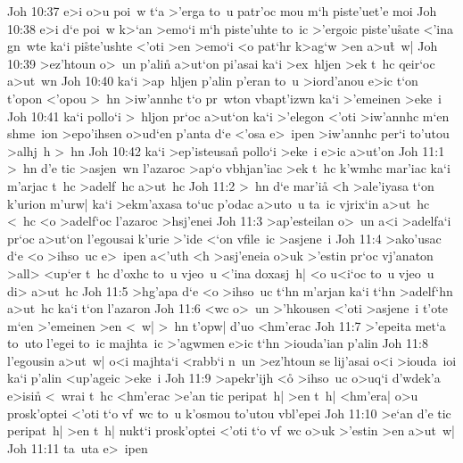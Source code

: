 \vs Joh 10:37
e>i
o>u
poi~w
t`a
>'erga
to~u
patr'oc
mou
m`h
piste'uet'e
moi\bibvsend
\vs Joh 10:38
e>i
d`e
poi~w
k>`an
>emo`i
m`h
piste'uhte
to~ic
>'ergoic
piste'u\r{s}ate
<'ina
gn~wte
ka`i
pi\r{s}te'ushte
<'oti
>en
>emo`i
<o
pat`hr
k>ag`w
>en
a>u\r{t}~w|\bibvsend
{}
\vs Joh 10:39
>ez'htoun
o>~un
p'alin\r{}
a>ut`on
pi'asai
ka`i
>ex~hljen
>ek
t~hc
qeir`oc
a>ut~wn\bibvsend
\vs Joh 10:40
ka`i
>ap~hljen
p'alin
p'eran
to~u
>iord'anou
e>ic
t`on
t'opon
<'opou
>~hn
>iw'annhc
t`o
pr~wton
vbapt'izwn
ka`i
>'emeinen
>eke~i\bibvsend
\vs Joh 10:41
ka`i
pollo`i
>~hljon
pr`oc
a>ut`on
ka`i
>'elegon
<'oti
>iw'annhc
m`en
shme~ion
>epo'ihsen
o>ud`en
p'anta
d`e
<'osa
e>~ipen
>iw'annhc
per`i
to'utou
>alhj~h
>~hn\bibvsend
\vs Joh 10:42
ka`i
>ep'isteusan\r{}
pollo`i
>eke~i
e>ic
a>ut'on\bibvsend
\vs Joh 11:1
>~hn
d'e
tic
>asjen~wn
l'azaroc
>ap`o
vbhjan'iac
>ek
t~hc
k'wmhc
mar'iac
ka`i
m'arjac
t~hc
>adelf~hc
a>ut~hc\bibvsend
\vs Joh 11:2
>~hn
d`e
mar'i\r{a}
<h
>ale'iyasa
t`on
k'urion
m'urw|
ka`i
>ekm'axasa
to`uc
p'odac
a>uto~u
ta~ic
vjrix`in
a>ut~hc
<~hc
<o
>adelf`oc
l'azaroc
>hsj'enei\bibvsend
\vs Joh 11:3
>ap'esteilan
o>~un
a<i
>adelfa`i
pr`oc
a>ut`on
l'egousai
k'urie
>'ide
<`on
vfile~ic
>asjene~i\bibvsend
\vs Joh 11:4
>ako'usac
d`e
<o
>ihso~uc
e>~ipen
a<'uth
<h
>asj'eneia
o>uk
>'estin
pr`oc
vj'anaton
>all>
<up`er
t~hc
d'oxhc
to~u
vjeo~u
<'ina
doxasj~h|
<o
u<i`oc
to~u
vjeo~u
di>
a>ut~hc\bibvsend
\vs Joh 11:5
>hg'apa
d`e
<o
>ihso~uc
t`hn
m'arjan
ka`i
t`hn
>adelf`hn
a>ut~hc
ka`i
t`on
l'azaron\bibvsend
\vs Joh 11:6
<wc
o>~un
>'hkousen
<'oti
>asjene~i
t'ote
m`en
>'emeinen
>en
<~w|
>~hn
t'opw|
d'uo
<hm'erac\bibvsend
\vs Joh 11:7
>'epeita
met`a
to~uto
l'egei
to~ic
majhta~ic
>'agwmen
e>ic
t`hn
>iouda'ian
p'alin\bibvsend
\vs Joh 11:8
l'egousin
a>ut~w|
o<i
majhta`i
<rabb`i
n~un
>ez'htoun
se
lij'asai
o<i
>iouda~ioi
ka`i
p'alin
<up'ageic
>eke~i\bibvsend
\vs Joh 11:9
>apekr'ijh
<o\r{}
>ihso~uc
o>uq`i
d'wdek'a
e>isin\r{}
<~wrai
t~hc
<hm'erac
>e'an
tic
peripat~h|
>en
t~h|
<hm'era|
o>u
prosk'optei
<'oti
t`o
vf~wc
to~u
k'osmou
to'utou
vbl'epei\bibvsend
\vs Joh 11:10
>e`an
d'e
tic
peripat~h|
>en
t~h|
nukt`i
prosk'optei
<'oti
t`o
vf~wc
o>uk
>'estin
>en
a>ut~w|\bibvsend
\vs Joh 11:11
ta~uta
e>~ipen
